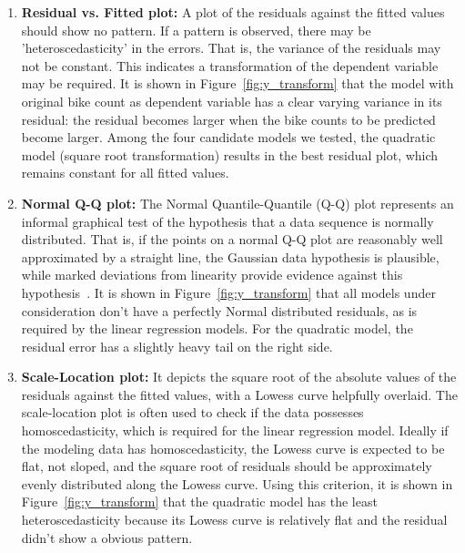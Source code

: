 \documentclass [11pt, proquest] {uwthesis}[2015/03/03]
\begin{document}
\begin{enumerate}
\item \textbf{Residual vs. Fitted plot:} A plot of the residuals against the fitted values should show no pattern. If a pattern is observed, there may be 'heteroscedasticity' in the errors. That is, the variance of the residuals may not be constant. This indicates a transformation of the dependent variable may be required. It is shown in Figure~\ref{fig:y_transform} that the model with original bike count as dependent variable has a clear varying variance in its residual: the residual becomes larger when the bike counts to be predicted become larger. Among the four candidate models we tested, the quadratic model (square root transformation) results in the best residual plot, which remains constant for all fitted values. 
\item \textbf{Normal Q-Q plot:} The Normal Quantile-Quantile (Q-Q) plot represents an informal graphical test of the hypothesis that a data sequence is normally distributed. That is, if the points on a normal Q-Q plot are reasonably well approximated by a straight line, the Gaussian data hypothesis is plausible, while marked deviations from linearity provide evidence against this hypothesis~\cite{Pearson2011}. It is shown in Figure~\ref{fig:y_transform} that all models under consideration don't have a perfectly Normal distributed residuals, as is required by the linear regression models. For the quadratic model, the residual error has a slightly heavy tail on the right side. 
\item \textbf{Scale-Location plot:} It depicts the square root of the absolute values of the residuals against the fitted values, with a Lowess curve helpfully overlaid. The scale-location plot is often used to check if the data possesses homoscedasticity, which is required for the linear regression model. Ideally if the modeling data has homoscedasticity, the Lowess curve is expected to be flat, not sloped, and the square root of residuals should be approximately evenly distributed along the Lowess curve. Using this criterion, it is shown in Figure~\ref{fig:y_transform} that the quadratic model has the least heteroscedasticity because its Lowess curve is relatively flat and the residual didn't show a obvious pattern.

\end{enumerate}
\end{document}
